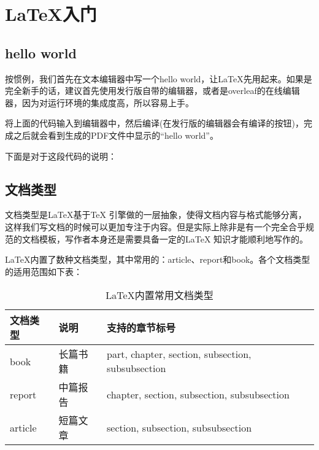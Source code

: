 \chapter{\LaTeX 入门}

\section{hello world}
按惯例，我们首先在文本编辑器中写一个hello world，让\LaTeX 先用起来。如果是完全新手的话，建议首先使用发行版自带的编辑器，或者是overleaf的在线编辑器，因为对运行环境的集成度高，所以容易上手。


将上面的代码输入到编辑器中，然后编译(在发行版的编辑器会有编译的按钮)，完成之后就会看到生成的PDF文件中显示的“hello
world”。

下面是对于这段代码的说明：
\begin{enumerate}
\end{enumerate}

\section{文档类型}\label{sec:doctype}
文档类型是\LaTeX 基于\TeX
引擎做的一层抽象，使得文档内容与格式能够分离，这样我们写文档的时候可以更加专注于内容。但是实际上除非是有一个完全合乎规范的文档模板，写作者本身还是需要具备一定的\LaTeX
知识才能顺利地写作的。

\LaTeX 内置了数种文档类型，其中常用的：article、report和book。各个文档类型的适用范围如下表：
\noindent
\begin{table}[ht]
	\begin{tabular}{lll} \toprule
		文档类型 & 说明     & 支持的章节标号                                    \\ \midrule
		book     & 长篇书籍 & part, chapter, section, subsection, subsubsection \\
		report   & 中篇报告 & chapter, section, subsection, subsubsection       \\
		article  & 短篇文章 & section, subsection, subsubsection                \\
		\bottomrule
	\end{tabular}
	\caption{\LaTeX 内置常用文档类型}
\end{table}

